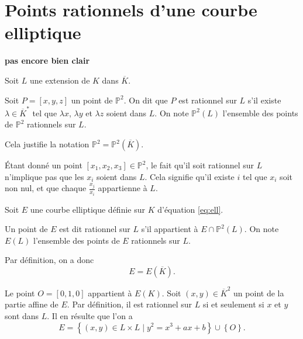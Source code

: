 \section{Points rationnels d'une courbe elliptique}
\textbf{pas encore bien clair}

Soit $L$ une extension de $K$ dans $\overline{K}$.

\begin{definition}
    Soit $P=\left[ x,y,z \right] $ un point de $\mathbb{P}^2$. On dit que $P$ est rationnel sur $L$ s'il existe $\lambda \in \overline{K}^{*}$ tel que $\lambda x$, $\lambda y$ et $\lambda z$ soient dans $L$. On note $\mathbb{P}^2(L)$ l'ensemble des points de $\mathbb{P}^2$ rationnels sur $L$.

    Cela justifie la notation $\mathbb{P}^2 = \mathbb{P}^2(\overline{K})$.
\end{definition}

\begin{remarque}
    Étant donné un point $[x_1,x_2,x_3] \in \mathbb{P}^2$, le fait qu'il soit rationnel sur $L$ n'implique pas que les $x_{i}$ soient dans $L$. Cela signifie qu'il existe $i$ tel que $x_{i}$ soit non nul, et que chaque $\frac{x_{j}}{x_{i}}$ appartienne à $L$.
\end{remarque}

Soit $E$ une courbe elliptique définie sur $K$ d'équation \eqref{eq:ell}.

\begin{definition}
    Un point de $E$ est dit rationnel sur $L$ s'il appartient à $E \cap \mathbb{P}^2(L)$. On note $E(L)$ l'ensemble des points de $E$ rationnels sur $L$.

    Par définition, on a donc
    \[
    E = E(\overline{K})
    .\] 
\end{definition}

Le point $O = [0,1,0]$ appartient à $E(K)$. Soit $(x,y) \in \overline{K}^2$ un point de la partie affine de $E$. Par définition, il est rationnel sur $L$ si et seulement si $x$ et $y$ sont dans $L$. Il en résulte que l'on a 
\[
E = \left\{ (x,y) \in L \times L \mid y^2 = x^3+ax+b \right\} \cup \left\{ O \right\} 
.\] 

\begin{exemple}
\end{exemple}
